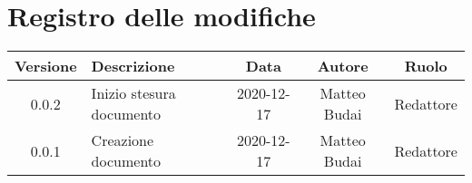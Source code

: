 \section*{Registro delle modifiche}

\begin{center}
	\begin{longtable}{|c|p{5cm}|c|c|c|}
	\hline
	\rowcolor{lighter-grayer}
	\textbf{Versione} & \textbf{Descrizione} & \textbf{Data} & \textbf{Autore} & \textbf{Ruolo} \\
	\hline
	\endfirsthead

	
	0.0.2 & Inizio stesura documento & 2020-12-17 & Matteo Budai & Redattore \\
	\hline
	0.0.1 & Creazione documento & 2020-12-17 & Matteo Budai & Redattore \\
	\hline

	\end{longtable}
\end{center}